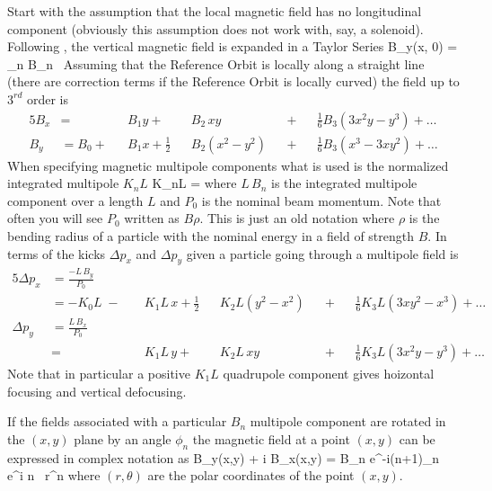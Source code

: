 Start with the assumption that the local magnetic field has no
longitudinal component (obviously this assumption does not work with,
say, a solenoid).  Following \mad, the vertical magnetic field is
expanded in a Taylor Series
\Begineq
  B_y(x, 0) = \sum_n B_n \, 
\Endeq
Assuming that the Reference Orbit is locally along a straight line
(there are correction terms if the Reference Orbit is locally curved) the 
field up to $3^{rd}$ order is
\begin{alignat}{5}
  B_x &=           &&B_1 y \plus         &&B_2 \, xy       && \plus && \frac{1}{6} B_3 (3x^2 y - y^3) \plus \ldots \\
  B_y &= B_0 \plus &&B_1 x + \frac{1}{2} &&B_2 (x^2 - y^2) && \plus && \frac{1}{6} B_3 (x^3 - 3x y^2) \plus \ldots
\end{alignat}
When specifying magnetic multipole components what is used is the
normalized integrated multipole $K_nL$
\Begineq
  K_nL = 
\Endeq
where $L \, B_n$ is the integrated multipole component over a length
$L$ and $P_0$ is the nominal beam momentum. Note that often you will see
$P_0$ written as $B\rho$. This is just an old notation where $\rho$
is the bending radius of a particle with the nominal energy in a field
of strength $B$. In terms of the kicks $\Delta p_x$ and $\Delta p_y$
given a particle going through a multipole field is
\begin{alignat}{5}
  \Delta p_x & = \frac{-L \, B_y}{P_0} \\
             & = -K_0 L \;-\; 
             && K_1 L \, x \plus 
             \frac{1}{2} && K_2 L (y^2 - x^2) && \plus 
             && \frac{1}{6} K_3 L (3x y^2 - x^3) \plus \ldots \nonumber \\
  \Delta p_y & = \frac{L \, B_x}{P_0} \\
             & =     
             && K_1 L \, y \plus 
             && K_2 L \, xy && \plus 
             && \frac{1}{6} K_3L (3x^2 y - y^3) \plus \ldots \nonumber 
\end{alignat}
Note that in particular a positive $K_1L$ quadrupole component gives
hoizontal focusing and vertical defocusing. 

If the fields associated with a particular $B_n$ multipole component
are rotated in the $(x, y)$ plane by an angle $\phi_n$ the magnetic
field at a point $(x,y)$ can be expressed in complex notation as
\Begineq
  B_y(x,y) + i B_x(x,y) = 
                 B_n e^{-i(n+1)\phi_n} \, e^{i n \theta} \, r^n 
\Endeq
where $(r, \theta)$ are the polar coordinates of the point $(x, y)$.

